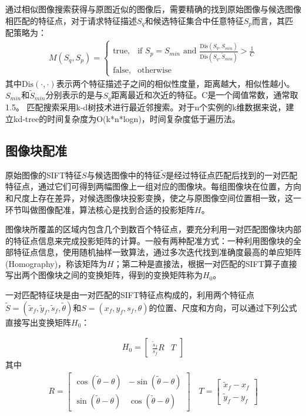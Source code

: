 \documentclass[UTF8]{csoarticle}
\begin{document}
通过相似图像搜索获得与原图近似的图像后，需要精确的找到原始图像与候选图像相匹配的特征点，对于请求特征描述\(S_q\)和候选特征集合中任意特征\(S_p\)而言，其匹配策略为：
\begin{align}
  M(S_q,S_p) = 
\begin{cases} 
\text{true}, & \mbox{if } S_p = S_{min}\text{ and }\frac{\text{Dis}(S_q,S_{min})}{\text{Dis}(S_q,\tilde{S}_{min})} > \frac{1}{C} \\
\text{false}, & \mbox{otherwise}
\end{cases}
\end{align}
其中\(\text{Dis}(\cdot,\cdot)\)表示两个特征描述子之间的相似性度量，距离越大，相似性越小。\(S_{min}\)和\(\tilde{S}_{min}\)分别表示的是与\(S_q\)距离最近和次近的特征。C是一个阈值常数，通常取1.5。%
匹配搜索采用k-d树技术进行最近邻搜索。对于n个实例的k维数据来说，建立kd-tree的时间复杂度为O(k*n*logn)，时间复杂度低于遍历法。

\subsection{图像块配准}
原始图像的SIFT特征\(S\)与候选图像中的特征\(\tilde{S}\)是经过特征点匹配后找到的一对匹配特征点，通过它们可得到两幅图像上一组对应的图像块。每组图像块在位置，方向和尺度上存在差异，对候选图像块投影变换，使之与原图像空间位置相一致，这一环节叫做图像配准，算法核心是找到合适的投影矩阵\(H\)。

图像块所覆盖的区域内包含几个到数百个特征点，要充分利用一对匹配图像块内部的特征点信息来完成投影矩阵的计算。一般有两种配准方式：一种利用图像块的全部特征点信息，使用随机抽样一致算法，通过多次迭代找到准确度最高的单应矩阵(Homography)，称该矩阵为\(H\)；第二种是直接法，根据一对匹配的SIFT算子直接写出两个图像块之间的变换矩阵，得到的变换矩阵称为\(H_0\)。

一对匹配特征块是由一对匹配的SIFT特征点构成的，利用两个特征点\(\tilde{S}=(\tilde{x}_f,\tilde{y}_f,\tilde{s}_f,\tilde{\theta})\)和\(S=(x_f,y_f,s_f,\theta)\)的位置、尺度和方向，可以通过下列公式直接写出变换矩阵\(H_0\)：

\begin{align}
  H_0 = 
  \begin{bmatrix}
  \frac{\tilde{s}_f}{s_f} R & T
  \end{bmatrix}
\end{align}
其中
\begin{align}
  R = 
  \begin{bmatrix}
    \cos{(\tilde{\theta}-\theta)} & -\sin{(\tilde{\theta}-\theta)} \\
    \sin{(\tilde{\theta}-\theta)} & \cos{(\tilde{\theta}-\theta)} 
  \end{bmatrix}
\hspace{1em}
  T = 
  \begin{bmatrix}
    \tilde{x}_f - x_f \\
    \tilde{y}_f - y_f
  \end{bmatrix}
\end{align}
\end{document}
